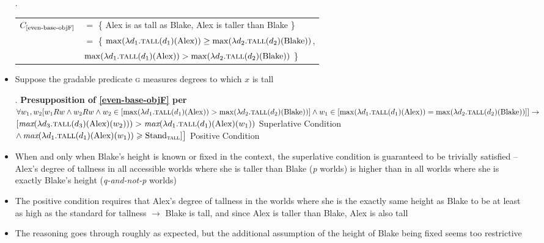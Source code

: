 \documentclass[11pt,letterpaper]{scrartcl}
\begin{document}
\begin{itemize}
    \ex. \begin{tabular}[t]{rl}
    $C_{\text{\ref{even-base-objF}}}$ & $=$ \{ Alex is as tall as Blake, Alex is taller than Blake \}\\
    & $=$ \{ $\max(\lambda d_1.\textsc{tall}(d_1)(\text{Alex})) \geq \max(\lambda d_2.\textsc{tall}(d_2)(\text{Blake}))$, \\
    & $\max(\lambda d_1.\textsc{tall}(d_1)(\text{Alex})) > \max(\lambda d_2.\textsc{tall}(d_2)(\text{Blake}))$ \}
    \end{tabular}
    
    \item Suppose the gradable predicate \textsc{g} measures degrees to which $x$ is tall
    
    \ex. \textbf{Presupposition of \ref{even-base-objF} per \cite{greenberg_revised_2018}}\\ 
    $\forall w_1, w_2 [w_1Rw \land w_2Rw \land w_2 \in [\max(\lambda d_1.\textsc{tall}(d_1)(\text{Alex})) > \max(\lambda d_2.\textsc{tall}(d_2)(\text{Blake}))]  \land w_1 \in [\max(\lambda d_1.\textsc{tall}(d_1)(\text{Alex})) = \max(\lambda d_2.\textsc{tall}(d_2)(\text{Blake}))]] \rightarrow$ \\
    $[\textit{max}(\lambda d_3.\textsc{tall}(d_3)(\text{Alex})(w_2))) > \textit{max}(\lambda d_1.\textsc{tall}(d_1)(\text{Alex})(w_1))$ \hspace*{\fill} Superlative Condition\\ 
    $\land \, \textit{max}(\lambda d_1.\textsc{tall}(d_1)(\text{Alex})(w_1)) \geqslant \text{Stand}_\textsc{tall} ] \big]$ \hspace*{\fill} Positive Condition
    
    \item When and only when Blake's height is known or fixed in the context, the superlative condition is guaranteed to be trivially satisfied  -- Alex's degree of tallness in all accessible worlds where she is taller than Blake (\textit{p} worlds) is higher than in all worlds where she is exactly Blake's height (\textit{q-and-not-p} worlds)
    
    \item The positive condition requires that Alex's degree of tallness in the worlds where she is the exactly same height as Blake to be at least as high as the standard for tallness $\rightarrow$ Blake is tall, and since Alex is taller than Blake, Alex is also tall
    
    \item The reasoning goes through roughly as expected, but the additional assumption of the height of Blake being fixed seems too restrictive
    

\end{itemize}
\end{document}

